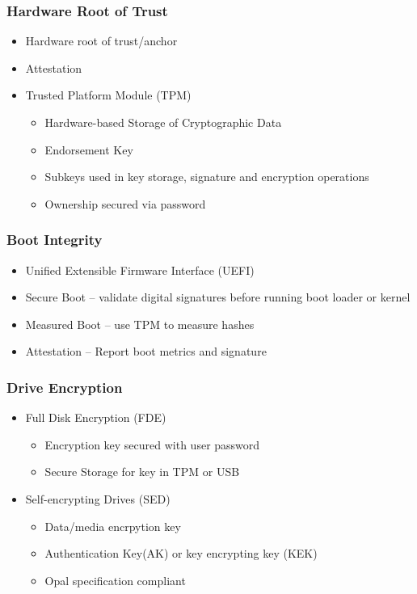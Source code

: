		\subsubsection {Hardware Root of Trust}
			\begin{itemize}
				\item Hardware root of trust/anchor
				\item Attestation
				\item Trusted Platform Module (TPM)
					\begin{itemize}
						\item Hardware-based Storage of Cryptographic Data
						\item Endorsement Key
						\item Subkeys used in key storage, signature and
							encryption operations
						\item Ownership secured via password
					\end{itemize}
			\end{itemize}
		\subsubsection {Boot Integrity}
			\begin{itemize}
				\item Unified Extensible Firmware Interface (UEFI)
				\item Secure Boot -- validate digital signatures before running boot
					loader or kernel
				\item Measured Boot -- use TPM to measure hashes
				\item Attestation -- Report boot metrics and signature
			\end{itemize}
		\subsubsection {Drive Encryption}
			\begin{itemize}
				\item Full Disk Encryption (FDE)
					\begin{itemize}
						\item Encryption key secured with user password
						\item Secure Storage for key in TPM or USB
					\end{itemize}
				\item Self-encrypting Drives (SED)
					\begin{itemize}
						\item Data/media encrpytion key
						\item Authentication Key(AK) or key encrypting key (KEK)
						\item Opal specification compliant
					\end{itemize}
			\end{itemize}
